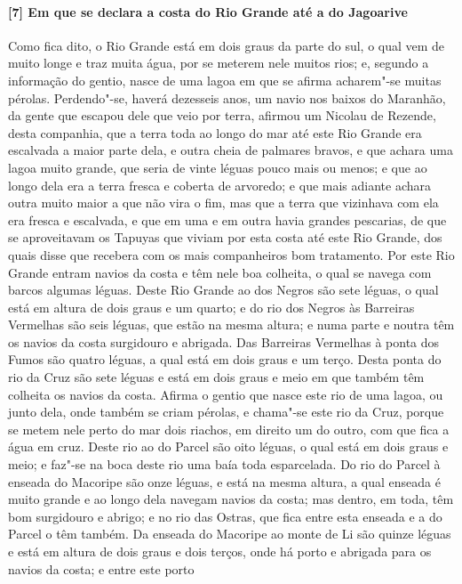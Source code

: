 \begin{linenumbers}
\paragraph{[7] Em que se declara a costa do Rio Grande até a do Jagoarive} \quad
Como fica dito, o Rio Grande está em dois graus da parte do sul, o qual vem de muito longe
e traz muita água, por se meterem nele muitos rios; e, segundo a informação do gentio,
nasce de uma lagoa em que se afirma acharem"-se muitas pérolas. Perdendo"-se, haverá
dezesseis anos, um navio nos baixos do Maranhão, da gente que escapou dele que veio por
terra, afirmou um Nicolau de Rezende, desta companhia, que a terra toda ao longo do mar
até este Rio Grande era escalvada a maior parte dela, e outra cheia de palmares bravos, e
que achara uma lagoa muito grande, que seria de vinte léguas pouco mais ou menos; e que ao
longo dela era a terra fresca e coberta de arvoredo; e que mais adiante achara outra muito
maior a que não vira o fim, mas que a terra que vizinhava com ela era fresca e escalvada,
e que em uma e em outra havia grandes pescarias, de que se aproveitavam os Tapuyas que
viviam por esta costa até este Rio Grande, dos quais disse que recebera com os mais
companheiros bom tratamento. Por este Rio Grande entram navios da costa e têm nele boa
colheita, o qual se navega com barcos algumas léguas. Deste Rio Grande ao dos Negros são
sete léguas, o qual está em altura de dois graus e um quarto; e do rio dos Negros às
Barreiras Vermelhas são seis léguas, que estão na mesma altura; e numa parte e noutra têm
os navios da costa surgidouro e abrigada. Das Barreiras Vermelhas à ponta dos Fumos são
quatro léguas, a qual está em dois graus e um terço. Desta ponta do rio da Cruz são sete
léguas e está em dois graus e meio em que também têm colheita os navios da costa. Afirma o
gentio que nasce este rio de uma lagoa, ou junto dela, onde também se criam pérolas, e
chama"-se este rio da Cruz, porque se metem nele perto do mar dois riachos, em direito um
do outro, com que fica a água em cruz. Deste rio ao do Parcel são oito léguas, o qual está
em dois graus e meio; e faz"-se na boca deste rio uma baía toda esparcelada. Do rio do
Parcel à enseada do Macoripe são onze léguas, e está na mesma altura, a qual enseada é
muito grande e ao longo dela navegam navios da costa; mas dentro, em toda, têm bom
surgidouro e abrigo; e no rio das Ostras, que fica entre esta enseada e a do Parcel o têm
também. Da enseada do Macoripe ao monte de Li são quinze léguas e está em altura de dois
graus e dois terços, onde há porto e abrigada para os navios da costa; e entre este porto

\end{linenumbers}
